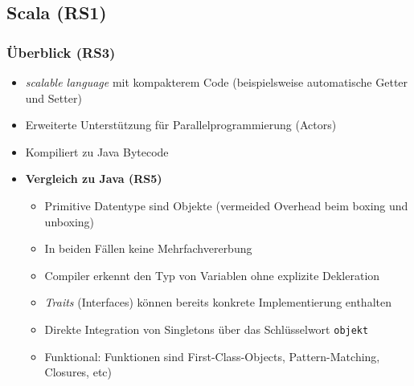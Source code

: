 \subsection{Scala (RS1)}

\subsubsection{Überblick (RS3)}
\begin{itemize}
	\item \textit{scalable language} mit kompakterem Code (beispielsweise automatische Getter und Setter)
	\item Erweiterte Unterstützung für Parallelprogrammierung (Actors)
	\item Kompiliert zu Java Bytecode
	\item \textbf{Vergleich zu Java (RS5)}
	\begin{itemize}
		\item Primitive Datentype sind Objekte (vermeided Overhead beim boxing und unboxing)
		\item In beiden Fällen keine Mehrfachvererbung
		\item Compiler erkennt den Typ von Variablen ohne explizite Dekleration
		\item \textit{Traits} (Interfaces) können bereits konkrete Implementierung enthalten
		\item Direkte Integration von Singletons über das Schlüsselwort \texttt{objekt}
		\item Funktional: Funktionen sind First-Class-Objects, Pattern-Matching, Closures, etc)
	\end{itemize}
\end{itemize}


